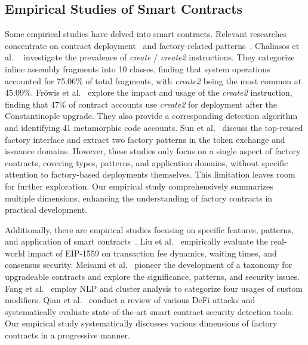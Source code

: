 \documentclass[acmsmall, screen]{acmart}
\begin{document}
	\subsection{Empirical Studies of Smart Contracts}
	Some empirical studies have delved into smart contracts. Relevant researches concentrate on
	contract deployment~\cite{DBLP:journals/pacmpl/ChaliasosGL22,DBLP:conf/fc/FrowisB22} and factory-related
	patterns~\cite{DBLP:conf/sigsoft/SunXLLL23,DBLP:conf/fc/SalehiCM22}. Chaliasos et al. ~\cite{DBLP:journals/pacmpl/ChaliasosGL22}
	investigate the prevalence of \textit{create} / \textit{create2} instructions. They categorize
	inline assembly fragments into 10 classes, finding that system operations accounted for 75.06\%
	of total fragments, with \textit{create2} being the most common at 45.09\%. Fröwis et al.~\cite{DBLP:conf/fc/FrowisB22}
	explore the impact and usage of the \textit{create2} instruction, finding that 47\% of contract
	accounts use \textit{create2} for deployment after the Constantinople upgrade. They also provide
	a corresponding detection algorithm and identifying 41 metamorphic code accounts. Sun et al.~\cite{DBLP:conf/sigsoft/SunXLLL23}
	discuss the top-reused factory interface and extract two factory patterns in the token exchange
	and issuance domains. However, these studies only focus on a single aspect of factory contracts,
	covering types, patterns, and application domains, without specific attention to factory-based
	deployments themselves. This limitation leaves room for further exploration. Our empirical study
	comprehensively summarizes multiple dimensions, enhancing the understanding of factory contracts
	in practical development.

	Additionally, there are empirical studies focusing on specific features, patterns, and
	application of smart contracts~\cite{DBLP:conf/uss/BodellMD23,DBLP:journals/corr/abs-2309-02391,DBLP:journals/tse/LiaoSZLHJCCZZ23,DBLP:conf/dsn/FynnBP20,DBLP:conf/issta/FangWYWCCLJ23,DBLP:conf/icse/YinZNWWLLG22,10.1145/3548606.3559341}.
	Liu et al.~\cite{10.1145/3548606.3559341} empirically evaluate the real-world impact of EIP-1559
	on transaction fee dynamics, waiting times, and consensus security. Meisami et al.~\cite{DBLP:conf/uss/BodellMD23}
	pioneer the development of a taxonomy for upgradeable contracts and explore the significance, patterns,
	and security issues. Fang et al.~\cite{DBLP:conf/issta/FangWYWCCLJ23} employ NLP and cluster
	analysis to categorize four usages of custom modifiers. Qian et al.~\cite{DBLP:journals/corr/abs-2309-02391}
	conduct a review of various DeFi attacks and systematically evaluate state-of-the-art smart
	contract security detection tools. Our empirical study systematically discusses various dimensions
	of factory contracts in a progressive manner.
\end{document}
